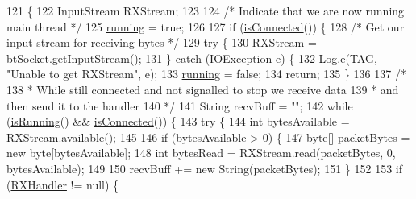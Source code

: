 \begin{DoxyCode}
121                       \{
122         InputStream RXStream;
123 
124         \textcolor{comment}{/* Indicate that we are now running main thread */}
125         \hyperlink{classcom_1_1jack_1_1motorbikestatistics_1_1_b_t_connection_a6193b7b92b7f2905a3a43d63db40aba8}{running} = \textcolor{keyword}{true};
126 
127         \textcolor{keywordflow}{if} (\hyperlink{classcom_1_1jack_1_1motorbikestatistics_1_1_b_t_connection_a22f33e46d9f460d78865d4c63b645357}{isConnected}()) \{
128             \textcolor{comment}{/* Get our input stream for receiving bytes */}
129             \textcolor{keywordflow}{try} \{
130                 RXStream = \hyperlink{classcom_1_1jack_1_1motorbikestatistics_1_1_b_t_connection_a0d47f94a35f7c8a07429975446e7b33b}{btSocket}.getInputStream();
131             \} \textcolor{keywordflow}{catch} (IOException e) \{
132                 Log.e(\hyperlink{classcom_1_1jack_1_1motorbikestatistics_1_1_b_t_connection_af9455991fec4de29ffc875eae117a761}{TAG}, \textcolor{stringliteral}{"Unable to get RXStream"}, e);
133                 \hyperlink{classcom_1_1jack_1_1motorbikestatistics_1_1_b_t_connection_a6193b7b92b7f2905a3a43d63db40aba8}{running} = \textcolor{keyword}{false};
134                 \textcolor{keywordflow}{return};
135             \}
136 
137             \textcolor{comment}{/*}
138 \textcolor{comment}{             * While still connected and not signalled to stop we receive data}
139 \textcolor{comment}{             * and then send it to the handler}
140 \textcolor{comment}{             */}
141             String recvBuff = \textcolor{stringliteral}{""};
142             \textcolor{keywordflow}{while} (\hyperlink{classcom_1_1jack_1_1motorbikestatistics_1_1_b_t_connection_a17b07494b0e7cba2e550054d7b47e309}{isRunning}() && \hyperlink{classcom_1_1jack_1_1motorbikestatistics_1_1_b_t_connection_a22f33e46d9f460d78865d4c63b645357}{isConnected}()) \{
143                 \textcolor{keywordflow}{try} \{
144                     \textcolor{keywordtype}{int} bytesAvailable = RXStream.available();
145 
146                     \textcolor{keywordflow}{if} (bytesAvailable > 0) \{
147                         byte[] packetBytes = \textcolor{keyword}{new} byte[bytesAvailable];
148                         \textcolor{keywordtype}{int} bytesRead = RXStream.read(packetBytes, 0, bytesAvailable);
149 
150                         recvBuff += \textcolor{keyword}{new} String(packetBytes);
151                     \}
152 
153                     \textcolor{keywordflow}{if} (\hyperlink{classcom_1_1jack_1_1motorbikestatistics_1_1_b_t_connection_a64fc7b02a2b9f052c6b05842b79b3cdc}{RXHandler} != null) \{

\end{DoxyCode}
